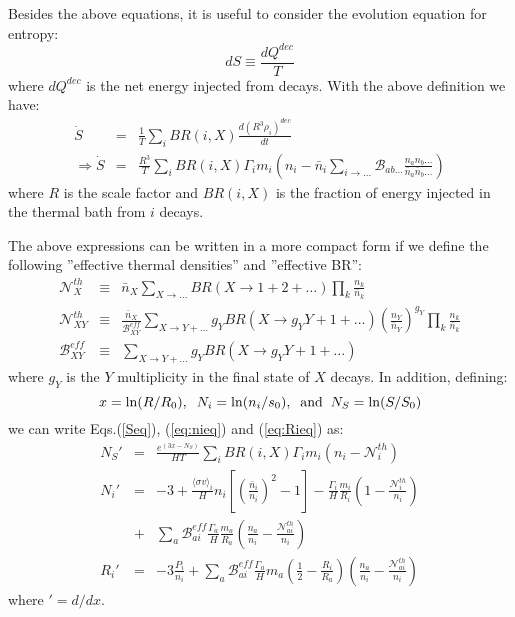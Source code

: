 \documentclass[preprint,notoc]{JHEP3}
\def\to{\rightarrow}
\def\sigv{\langle \sigma v \rangle}
\def\To{\Rightarrow}
\def\to{\rightarrow}
\begin{document}
Besides the above equations, it is useful to consider the evolution equation for entropy:
\begin{equation}
dS \equiv \frac{dQ^{dec}}{T}
\end{equation}
where $dQ^{dec}$ is the net energy injected from decays.
With the above definition we have:
\begin{eqnarray}
\dot{S} & = & \frac{1}{T}\sum_i BR(i,X)
\frac{d\left(R^3 \rho_i\right)^{dec}}{dt}  \nonumber \\
\To \dot{S} & = & \frac{R^3}{T}\sum_i BR(i,X)
\Gamma_i m_i\left(n_i - \bar{n}_i \sum_{i\to\ldots} \mathcal{B}_{ab\ldots} \frac{n_a n_b\ldots}{\bar{n}_a
\bar{n}_b\ldots} \right) \label{Seq}
\end{eqnarray}
where $R$ is the scale factor and $BR(i,X)$ is the fraction of energy injected
in the thermal bath from $i$ decays.
 
 
The above expressions can be written in a more compact form if we define
the following ''effective thermal densities'' and ''effective BR'':
\begin{eqnarray}
\mathcal{N}^{th}_{X} & \equiv &  \bar{n}_X \sum_{X \to \ldots} BR(X \to 1 + 2 +
\ldots)
\prod_{k}
\frac{n_k}{\bar{n}_k} \nonumber \\
\mathcal{N}^{th}_{XY} & \equiv & \frac{\bar{n}_X}{\mathcal{B}^{eff}_{XY}}
\sum_{X \to Y + \ldots} g_Y BR(X \to g_Y Y + 1 + \ldots)
\left(\frac{n_Y}{\bar{n}_Y}\right)^{g_Y} \prod_{k} \frac{n_k}{\bar{n}_k}
\nonumber \\
\mathcal{B}^{eff}_{XY} & \equiv & \sum_{X \to Y + \ldots} g_Y BR(X \to g_Y Y +
1+\ldots) \nonumber
\end{eqnarray}
where $g_Y$ is the $Y$ multiplicity in the final state of $X$ decays. 
In addition, defining:
\begin{equation}
x = \ln(R/R_0),\;\; N_i = \ln(n_i/s_0),\;\; {\rm and}\;\; N_S = \ln(S/S_0)
\end{equation}
we can write Eqs.(\ref{Seq}), (\ref{eq:nieq}) and (\ref{eq:Rieq}) as:
\begin{eqnarray}
N_S' & = & \frac{e^{(3 x - N_S)}}{HT} \sum_{i} BR(i,X) \Gamma_i m_i \left(n_i -
\mathcal{N}_{i}^{th} \right) 
\label{Seqb} \\
N_i' & = & -3 + \frac{\sigv_i}{H} n_i [\left(\frac{\bar{n}_i}{n_i}\right)^2
-1] -  \frac{\Gamma_i}{H} \frac{m_i}{R_i}\left(1 -
\frac{\mathcal{N}_{i}^{th}}{n_i} \right) \nonumber  \\
 & + & \sum_{a} \mathcal{B}_{ai}^{eff} \frac{\Gamma_a}{H}
 \frac{m_a}{R_a}\left(\frac{n_a}{n_i} - \frac{\mathcal{N}_{ai}^{th}}{n_i}
  \right)
 \\
R_i' & = &  -3 \frac{P_i}{n_i} + \sum_{a} \mathcal{B}_{ai}^{eff}
\frac{\Gamma_a}{H} m_a \left( \frac{1}{2} - \frac{R_i}{R_a} \right) \left(\frac{n_a}{n_i} -
\frac{\mathcal{N}_{ai}^{th}}{n_i} \right)
\label{Nieq}
\end{eqnarray}
where $'=d/dx$.
\end{document}
